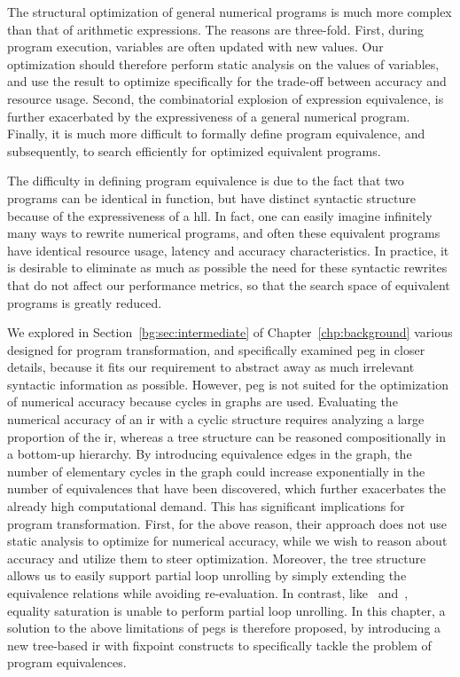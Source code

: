 The structural optimization of general numerical programs is much more complex
than that of arithmetic expressions.  The reasons are three-fold.  First,
during program execution, variables are often updated with new values.  Our
optimization should therefore perform static analysis on the values of
variables, and use the result to optimize specifically for the trade-off
between accuracy and resource usage.  Second, the combinatorial explosion of
expression equivalence, is further exacerbated by the expressiveness of a
general numerical program.  Finally, it is much more difficult to formally
define program equivalence, and subsequently, to search efficiently for
optimized equivalent programs.

The difficulty in defining program equivalence is due to the fact that two
programs can be identical in function, but have distinct syntactic structure
because of the expressiveness of a \gls{hll}\@.  In fact, one can easily
imagine infinitely many ways to rewrite numerical programs, and often these
equivalent programs have identical resource usage, latency and accuracy
characteristics.  In practice, it is desirable to eliminate as much as possible
the need for these syntactic rewrites that do not affect our performance
metrics, so that the search space of equivalent programs is greatly reduced.

We explored in Section~\ref{bg:sec:intermediate} of
Chapter~\ref{chp:background} various  designed for program
transformation, and specifically examined \acrfull{peg} in closer details,
because it fits our requirement to abstract away as much irrelevant syntactic
information as possible.  However, \gls{peg} is not suited for the optimization
of numerical accuracy because cycles in graphs are used.  Evaluating the
numerical accuracy of an \gls{ir} with a cyclic structure requires analyzing
a large proportion of the \gls{ir}, whereas a tree structure can be reasoned
compositionally in a bottom-up hierarchy.  By introducing equivalence edges
in the graph, the number of elementary cycles in the graph could increase
exponentially in the number of equivalences that have been discovered,
which further exacerbates the already high computational demand.  This has
significant implications for program transformation.  First, for the above
reason, their approach does not use static analysis to optimize for numerical
accuracy, while we wish to reason about accuracy and utilize them to steer
optimization.  Moreover, the tree structure allows us to easily support partial
loop unrolling by simply extending the equivalence relations while avoiding
re-evaluation.  In contrast, like~\cite{martel09} and~\cite{damouche15},
equality saturation is unable to perform partial loop unrolling.  In this
chapter, a solution to the above limitations of \glspl{peg} is therefore
proposed, by introducing a new tree-based \gls{ir} with fixpoint constructs to
specifically tackle the problem of program equivalences.

